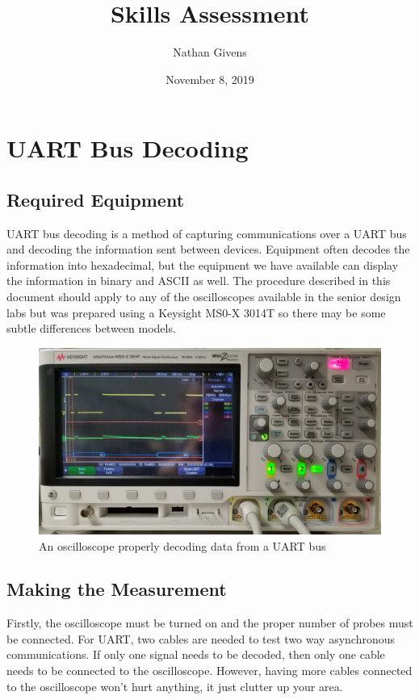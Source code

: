 \documentclass{article}
\title{Skills Assessment}
\author{Nathan Givens}
\date{November 8, 2019}
\begin{document}
  \maketitle

  \section{UART Bus Decoding}

  \subsection{Required Equipment}

  UART bus decoding is a method of capturing communications over a UART bus and
  decoding the information sent between devices. Equipment often decodes the
  information into hexadecimal, but the equipment we have available can display
  the information in binary and ASCII as well. The procedure described in this
  document should apply to any of the oscilloscopes available in the senior
  design labs but was prepared using a Keysight MS0-X 3014T so there may be
  some subtle differences between models.

  \begin{figure}[h]
    \includegraphics[width=\textwidth]{full_scope}
    \caption{An oscilloscope properly decoding data from a UART bus}
  \end{figure}

  \subsection{Making the Measurement}

  Firstly, the oscilloscope must be turned on and the proper number of probes
  must be connected. For UART, two cables are needed to test two way
  asynchronous communications. If only one signal needs to be decoded, then only
  one cable needs to be connected to the oscilloscope. However, having more
  cables connected to the oscilloscope won't hurt anything, it just clutter up
  your area.
\end{document}

